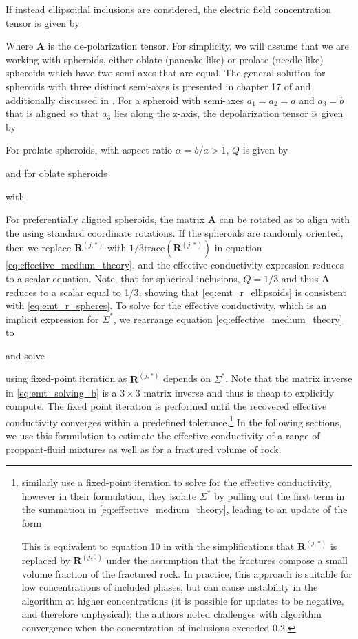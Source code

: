 If instead ellipsoidal inclusions are considered, the electric field concentration tensor is given by

Where $\mathbf{A}$ is the de-polarization tensor. For simplicity, we will assume that we are working with spheroids, either oblate (pancake-like) or prolate (needle-like) spheroids which have two semi-axes that are equal. The general solution for spheroids with three distinct semi-axes is presented in chapter 17 of \cite{Torquato2002} and additionally discussed in \cite{Berryman2013}. For a spheroid with semi-axes $a_1 = a_2 = a$ and $a_3 = b$ that is aligned so that $a_3$ lies along the z-axis, the depolarization tensor is given by

For prolate spheroids, with aspect ratio $\alpha = b/a > 1$, $Q$ is given by

and for oblate spheroids

with

For preferentially aligned spheroids, the matrix $\mathbf{A}$ can be rotated as to align with the using standard coordinate rotations. If the spheroids are randomly oriented, then we replace $\mathbf{R}^{(j,*)}$ with $1/3\text{trace}(\mathbf{R}^{(j,*)})$ in equation \ref{eq:effective_medium_theory}, and the effective conductivity expression reduces to a scalar equation. Note, that for spherical inclusions, $Q = 1/3$ and thus $\mathbf{A}$ reduces to a scalar equal to 1/3, showing that \ref{eq:emt_r_ellipsoids} is consistent with \ref{eq:emt_r_spheres}.
To solve for the effective conductivity, which is an implicit expression for $\Sigma^*$, we rearrange equation \ref{eq:effective_medium_theory} to

and solve

using fixed-point iteration as $\mathbf{R}^{(j, *)}$ depends on $\Sigma^*$. Note that the matrix inverse in \ref{eq:emt_solving_b} is a $3\times 3$ matrix inverse and thus is cheap to explicitly compute. The fixed point iteration is performed until the recovered effective conductivity converges within a predefined tolerance.\footnote{\cite{Berryman2013} similarly use a fixed-point iteration to solve for the effective conductivity, however in their formulation, they isolate $\Sigma^*$ by pulling out the first term in the summation in \ref{eq:effective_medium_theory}, leading to an update of the form

This is equivalent to equation 10 in \cite{Berryman2013} with the simplifications that $\mathbf{R}^{(j, *)}$ is replaced by $\mathbf{R}^{(j, 0)}$ under the assumption that the fractures compose a small volume fraction of the fractured rock. In practice, this approach is suitable for low concentrations of included phases, but can cause instability in the algorithm at higher concentrations (it is possible for updates to be negative, and therefore unphysical); the authors noted challenges with algorithm convergence when the concentration of inclusions exceeded 0.2.} In the following sections, we use this formulation to estimate the effective conductivity of a range of proppant-fluid mixtures as well as for a fractured volume of rock.

